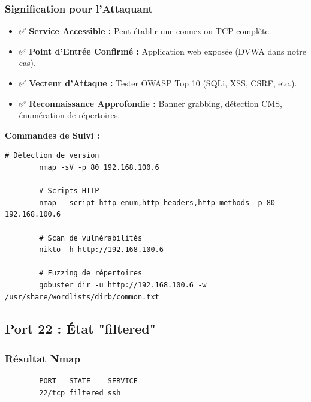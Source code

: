 \documentclass[12pt,a4paper,openany]{report}
\begin{document}
	\subsubsection{Signification pour l'Attaquant}
	\begin{itemize}
		\item ✅ \textbf{Service Accessible :} Peut établir une connexion TCP complète.
		\item ✅ \textbf{Point d'Entrée Confirmé :} Application web exposée (DVWA dans notre cas).
		\item ✅ \textbf{Vecteur d'Attaque :} Tester OWASP Top 10 (SQLi, XSS, CSRF, etc.).
		\item ✅ \textbf{Reconnaissance Approfondie :} Banner grabbing, détection CMS, énumération de répertoires.
	\end{itemize}
	
	\textbf{Commandes de Suivi :}
	\begin{lstlisting}[caption=Exploitation potentielle port 80]
		# Détection de version
		nmap -sV -p 80 192.168.100.6
		
		# Scripts HTTP
		nmap --script http-enum,http-headers,http-methods -p 80 192.168.100.6
		
		# Scan de vulnérabilités
		nikto -h http://192.168.100.6
		
		# Fuzzing de répertoires
		gobuster dir -u http://192.168.100.6 -w /usr/share/wordlists/dirb/common.txt
	\end{lstlisting}
	
	\subsection{Port 22 : État "filtered"}
	
	\subsubsection{Résultat Nmap}
	\begin{lstlisting}
		PORT   STATE    SERVICE
		22/tcp filtered ssh
	\end{lstlisting}
	
\end{document}
